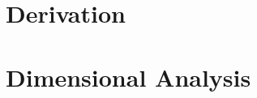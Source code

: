 \documentclass{article}
\begin{document}
\begin{figure}[h]
  \begin{center}
    
  \end{center}
  \caption[Convergence of DCS Curves]{
  }
  \label{fig:convergence-dcs-curves}
\end{figure}

\clearpage

\section{Derivation}
\label{sec:derivation}

\section{Dimensional Analysis}
\label{sec:dimensional-analysis}
\end{document}
